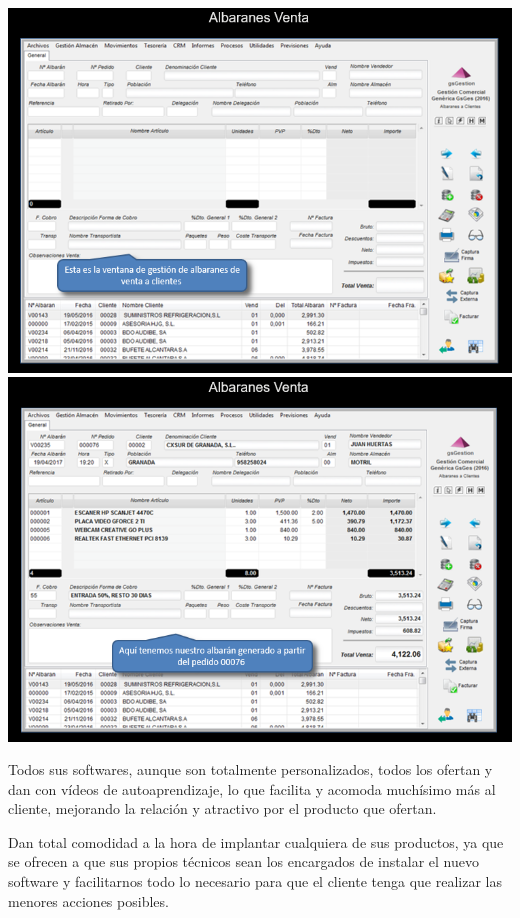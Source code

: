 \documentclass{article}
\begin{document}
\begin{itemize}
\begin{flushleft}
	\includegraphics[scale=0.65]{imagenes/CapturasoftwareSaaS1m.png}
	\includegraphics[scale=0.65]{imagenes/CapturasoftwareSaaS1n.png}
\end{flushleft}	

\end{itemize}
Todos sus softwares, aunque son totalmente personalizados, todos los ofertan y dan con vídeos de autoaprendizaje, lo que facilita y acomoda muchísimo más al cliente, mejorando la relación y atractivo por el producto que ofertan. 

Dan total comodidad a la hora de implantar cualquiera de sus productos, ya que se ofrecen a que sus propios técnicos sean los encargados de instalar el nuevo software y facilitarnos todo lo necesario para que el cliente tenga que realizar las menores acciones posibles. 
\end{document}
